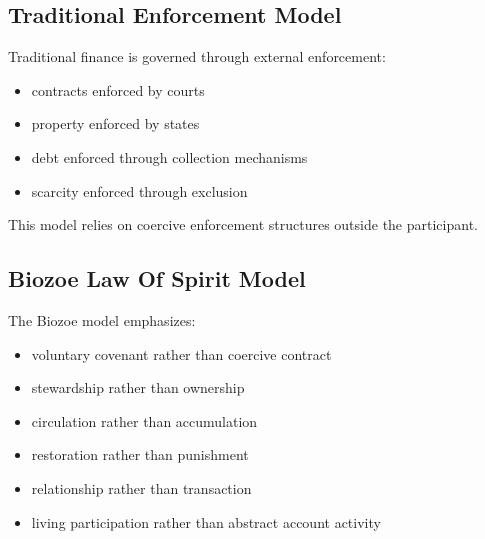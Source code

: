 ﻿\documentclass[12pt]{article}
\begin{document}
\subsection{Traditional Enforcement Model}


Traditional finance is governed through external enforcement:

\begin{itemize}
  \item contracts enforced by courts
\end{itemize}
\begin{itemize}
  \item property enforced by states
\end{itemize}
\begin{itemize}
  \item debt enforced through collection mechanisms
\end{itemize}
\begin{itemize}
  \item scarcity enforced through exclusion
\end{itemize}

This model relies on coercive enforcement structures outside the participant.

\subsection{Biozoe Law Of Spirit Model}


The Biozoe model emphasizes:

\begin{itemize}
  \item voluntary covenant rather than coercive contract
\end{itemize}
\begin{itemize}
  \item stewardship rather than ownership
\end{itemize}
\begin{itemize}
  \item circulation rather than accumulation
\end{itemize}
\begin{itemize}
  \item restoration rather than punishment
\end{itemize}
\begin{itemize}
  \item relationship rather than transaction
\end{itemize}
\begin{itemize}
  \item living participation rather than abstract account activity
\end{itemize}
\end{document}
